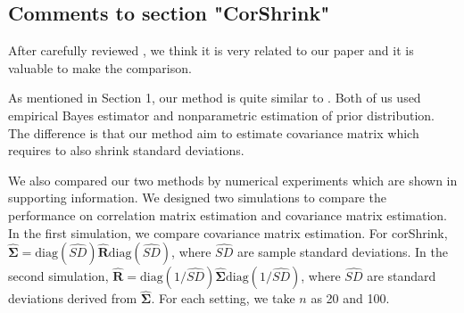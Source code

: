 \documentclass[12pt]{article}
\def\bs{\boldsymbol}
\begin{document}
\subsection{Comments to section "CorShrink"}
After carefully reviewed \cite{dey2018}, we think it is very related to our paper and it is valuable to make the comparison.

As mentioned in Section 1, our method is quite similar to \cite{dey2018}. Both of us used empirical Bayes estimator and nonparametric estimation of prior distribution. The difference is that our method aim to estimate covariance matrix which requires to also shrink standard deviations.

We also compared our two methods by numerical experiments which are shown in supporting information. We designed two simulations to compare the performance on correlation matrix estimation and covariance matrix estimation. In the first simulation, we compare covariance matrix estimation. For corShrink, $\widehat{\bs{\Sigma}} = \text{diag}(\widehat{SD}) \widehat{\bs{R}} \text{diag}(\widehat{SD})$, where $\widehat{SD}$ are sample standard deviations. In the second simulation, $\bs{\widehat{R}} = \text{diag}(1/\widehat{SD})\widehat{\bs{\Sigma}}\text{diag}(1/\widehat{SD})$, where $\widehat{SD}$ are standard deviations derived from $\widehat{\bs{\Sigma}}$. For each setting, we take $n$ as 20 and 100. 
\end{document}
